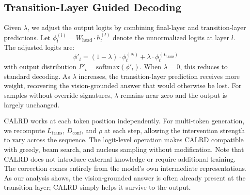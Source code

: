 \subsection{Transition-Layer Guided Decoding}

Given $\lambda$, we adjust the output logits by combining final-layer and transition-layer predictions. Let $\phi^{(l)}_t = W_{\text{head}} \cdot h^{(l)}_t$ denote the unnormalized logits at layer $l$. The adjusted logits are:
\begin{equation}
\phi'_t = (1 - \lambda) \cdot \phi^{(N)}_t + \lambda \cdot \phi^{(L_{\text{trans}})}_t
\end{equation}
with output distribution $P'_t = \text{softmax}(\phi'_t)$. When $\lambda = 0$, this reduces to standard decoding. As $\lambda$ increases, the transition-layer prediction receives more weight, recovering the vision-grounded answer that would otherwise be lost. For samples without override signatures, $\lambda$ remains near zero and the output is largely unchanged.


CALRD works at each token position independently. For multi-token generation, we recompute $L_{\text{trans}}$, $D_{\text{conf}}$, and $\rho$ at each step, allowing the intervention strength to vary across the sequence. The logit-level operation makes CALRD compatible with greedy, beam search, and nucleus sampling without modification. Note that CALRD does not introduce external knowledge or require additional training. The correction comes entirely from the model's own intermediate representations. As our analysis shows, the vision-grounded answer is often already present at the transition layer; CALRD simply helps it survive to the output.
